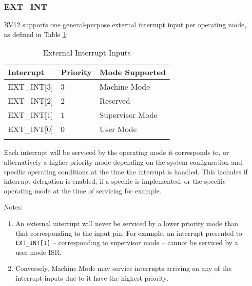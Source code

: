 \subsubsection{EXT\_INT}\label{ext_int}

RV12 supports one general-purpose external interrupt input per operating
mode, as defined in Table \ref{tab:external-interrupt-inputs}:

\begin{longtable}[]{@{}lll@{}}
\toprule
Interrupt & Priority & Mode Supported\tabularnewline
\midrule
\endhead
EXT\_INT{[}3{]} & 3 & Machine Mode\tabularnewline
EXT\_INT{[}2{]} & 2 & Reserved\tabularnewline
EXT\_INT{[}1{]} & 1 & Supervisor Mode\tabularnewline
EXT\_INT{[}0{]} & 0 & User Mode\tabularnewline
\bottomrule
\caption{External Interrupt Inputs}
\label{tab:external-interrupt-inputs}
\end{longtable}

Each interrupt will be serviced by the operating mode it corresponds to,
or alternatively a higher priority mode depending on the system
configuration and specific operating conditions at the time the
interrupt is handled. This includes if interrupt delegation is enabled,
if a specific is implemented, or the specific operating mode at the time
of servicing for example.

Notes:

\begin{enumerate}
\def\labelenumi{\arabic{enumi}.}
\item
  An external interrupt will never be serviced by a lower priority mode
  than that corresponding to the input pin. For example, an interrupt
  presented to \texttt{EXT\_INT{[}1{]}} -- corresponding to supervisor mode --
  cannot be serviced by a user mode ISR.
\item
  Conversely, Machine Mode may service interrupts arriving on any of the
  interrupt inputs due to it have the highest priority.
\end{enumerate}